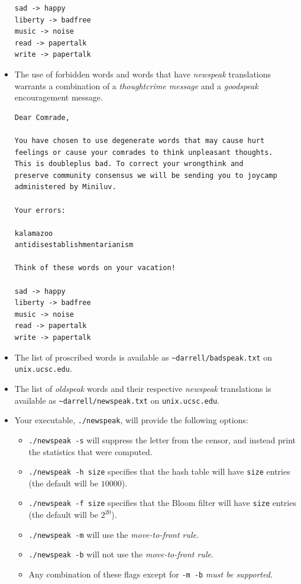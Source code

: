 \documentclass{article}
\begin{document}
\begin{itemize}
\begin{lstlisting}[title=Example goodspeak message.]
sad -> happy
liberty -> badfree
music -> noise
read -> papertalk
write -> papertalk
\end{lstlisting}
\item The use of forbidden words and words that have \emph{newspeak}
    translations warrants a combination of a \emph{thoughtcrime message} and a
    \emph{goodspeak} encouragement message.
\begin{lstlisting}[title=Example thoughtcrime/goodspeak message.]
Dear Comrade,

You have chosen to use degenerate words that may cause hurt
feelings or cause your comrades to think unpleasant thoughts.
This is doubleplus bad. To correct your wrongthink and
preserve community consensus we will be sending you to joycamp
administered by Miniluv.

Your errors:

kalamazoo
antidisestablishmentarianism

Think of these words on your vacation!

sad -> happy
liberty -> badfree
music -> noise
read -> papertalk
write -> papertalk
\end{lstlisting}
\item The list of proscribed words is available as \verb+~darrell/badspeak.txt+
    on \texttt{unix.ucsc.edu}.
\item The list of \emph{oldspeak} words and their respective \emph{newspeak}
    translations is available as \verb+~darrell/newspeak.txt+ on
    \texttt{unix.ucsc.edu}.
\item Your executable, \texttt{./newspeak}, will provide the following options:
        \begin{itemize}
        \item \texttt{./newspeak -s} will suppress the letter from the censor, and instead print the
        statistics that were computed.
        \item \texttt{./newspeak -h size} specifies that the hash table will have
        \texttt{size} entries (the default will be $10000$).
        \item \texttt{./newspeak -f size} specifies that the Bloom filter will have
        \texttt{size} entries (the default will be $2^{20}$).
        \item \texttt{./newspeak -m} will use the \emph{move-to-front rule}.
        \item \texttt{./newspeak -b} will not use the \emph{move-to-front rule}.
        \item Any combination of these flags except for \texttt{-m -b} \emph{must be supported}.
        \end{itemize}
\end{itemize}
\end{document}
